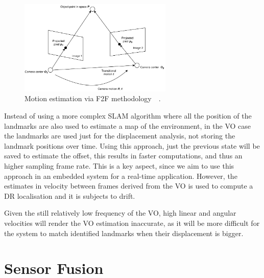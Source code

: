\begin{figure}[!ht]
  \begin{center}
    \includegraphics[width=0.65\textwidth]{Images/2-Background/VO.pdf}
  \end{center}
  \caption{Motion estimation via \gls{F2F} methodology~\cite{camera}~\cite{cameraa}.}
  \label{fig:camera}
\end{figure}

Instead of using a more complex \gls{SLAM} algorithm where all the position of the landmarks are also used to estimate a map of the environment, in the \gls{VO} case the landmarks are used just for the displacement analysis, not storing the landmark positions over time.
Using this approach, just the previous state will be saved to estimate the offset, this results in faster computations, and thus an higher sampling frame rate.
This is a key aspect, since we aim to use this approach in an embedded system for a real-time application. However, the estimates in velocity between frames derived from the \gls{VO} is used to compute a \gls{DR} localisation and it is subjects to drift.


Given the still relatively low frequency of the \gls{VO}, high linear and angular velocities will render the \gls{VO} estimation inaccurate, as it will be more difficult for the system to match identified landmarks when their displacement is bigger.



\section{Sensor Fusion}


